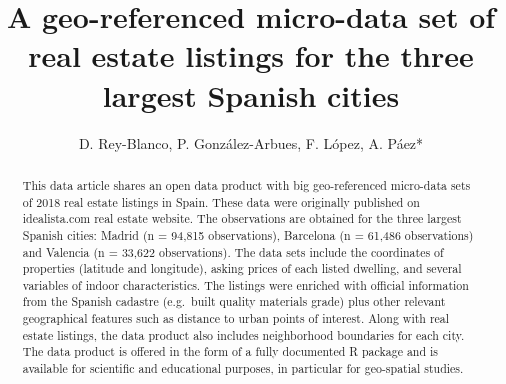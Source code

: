 \documentclass[Royal,times,sageh]{sagej}
\begin{document}

\title{A geo-referenced micro-data set of real estate listings for the
three largest Spanish cities}


\author{D. Rey-Blanco, P. González-Arbues, F.
López, A. Páez*}




\begin{abstract}
This data article shares an open data product with big geo-referenced
micro-data sets of 2018 real estate listings in Spain. These data were
originally published on idealista.com real estate website. The
observations are obtained for the three largest Spanish cities: Madrid
(n = 94,815 observations), Barcelona (n = 61,486 observations) and
Valencia (n = 33,622 observations). The data sets include the
coordinates of properties (latitude and longitude), asking prices of
each listed dwelling, and several variables of indoor characteristics.
The listings were enriched with official information from the Spanish
cadastre (e.g.~built quality materials grade) plus other relevant
geographical features such as distance to urban points of interest.
Along with real estate listings, the data product also includes
neighborhood boundaries for each city. The data product is offered in
the form of a fully documented R package and is available for scientific
and educational purposes, in particular for geo-spatial studies.
\end{abstract}


\maketitle
\end{document}
